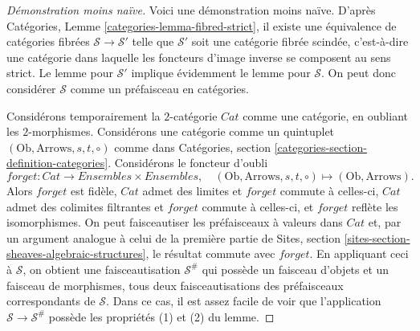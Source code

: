 \begin{proof}[Démonstration moins naïve]
Voici une démonstration moins naïve.
D'après Catégories, Lemme \ref{categories-lemma-fibred-strict},
il existe une équivalence de
catégories fibrées $\mathcal{S} \to \mathcal{S}'$ telle que $\mathcal{S}'$
soit une catégorie fibrée scindée, c'est-à-dire une catégorie dans laquelle les foncteurs
d'image inverse se composent au sens strict. Le lemme pour $\mathcal{S}'$
implique évidemment le lemme pour $\mathcal{S}$. On peut donc considérer $\mathcal{S}$
comme un préfaisceau en catégories.

\medskip\noindent
Considérons temporairement la $2$-catégorie $\textit{Cat}$ comme une
catégorie, en oubliant les $2$-morphismes.
Considérons une catégorie comme un quintuplet
$(\text{Ob}, \text{Arrows}, s, t, \circ)$ comme dans
Catégories, section \ref{categories-section-definition-categories}.
Considérons le foncteur d'oubli
$$
forget : \textit{Cat} \to \textit{Ensembles} \times \textit{Ensembles}, \quad
(\text{Ob}, \text{Arrows}, s, t, \circ)
\mapsto
(\text{Ob}, \text{Arrows}).
$$
Alors $forget$ est fidèle, $\textit{Cat}$ admet des limites et
$forget$ commute à celles-ci, $\textit{Cat}$ admet des colimites filtrantes et
$forget$ commute à celles-ci, et $forget$ reflète les isomorphismes.
On peut faisceautiser les préfaisceaux à valeurs dans $\textit{Cat}$ et,
par un argument analogue à celui de la première partie de
Sites, section \ref{sites-section-sheaves-algebraic-structures},
le résultat commute avec $forget$. En appliquant ceci à
$\mathcal{S}$, on obtient une faisceautisation $\mathcal{S}^\#$
qui possède un faisceau d'objets et un faisceau de morphismes,
tous deux faisceautisations des préfaisceaux correspondants
de $\mathcal{S}$. Dans ce cas, il est assez
facile de voir que l'application $\mathcal{S} \to \mathcal{S}^\#$
possède les propriétés (1) et (2) du lemme.


\end{proof}
